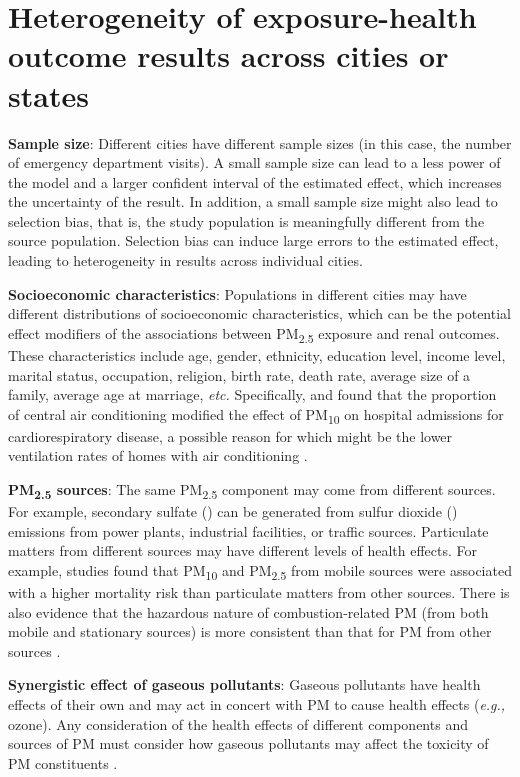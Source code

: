 \documentclass[11pt]{article}
\newcommand{\tsub}{\textsubscript}
\begin{document}
\section{Heterogeneity of exposure-health outcome results across cities or states}
\begin{enumerate*}[{[1)]}]
    \item \textbf{Sample size}: Different cities have different sample sizes (in this case, the number of emergency department visits). A small sample size can lead to a less power of the model and a larger confident interval of the estimated effect, which increases the uncertainty of the result. In addition, a small sample size might also lead to selection bias, that is, the study population is meaningfully different from the source population. Selection bias can induce large errors to the estimated effect, leading to heterogeneity in results across individual cities. 
    \item \textbf{Socioeconomic characteristics}: Populations in different cities may have different distributions of socioeconomic characteristics, which can be the potential effect modifiers of the associations between PM\tsub{2.5} exposure and renal outcomes. These characteristics include age, gender, ethnicity, education level, income level, marital status, occupation, religion, birth rate, death rate, average size of a family, average age at marriage, \textit{etc.} Specifically, \citet{janssen2002air} and \citet{medina2006effect} found that the proportion of central air conditioning modified the effect of PM\tsub{10} on hospital admissions for cardiorespiratory disease, a possible reason for which might be the lower ventilation rates of homes with air conditioning \citep{suh1992personal}. 
    \item \textbf{PM\tsub{2.5} sources}: The same PM\tsub{2.5} component may come from different sources. For example, secondary sulfate () can be generated from sulfur dioxide () emissions from power plants, industrial facilities, or traffic sources. Particulate matters from different sources may have different levels of health effects. For example, studies \citep{laden2000association, zeka2005short} found that PM\tsub{10} and PM\tsub{2.5} from mobile sources were associated with a higher mortality risk than particulate matters from other sources. There is also evidence that the hazardous nature of combustion-related PM (from both mobile and stationary sources) is more consistent than that for PM from other sources \citep{world2007health}.
    \item \textbf{Synergistic effect of gaseous pollutants}: Gaseous pollutants have health effects of their own and may act in concert with PM to cause health effects (\textit{e.g.,} ozone). Any consideration of the health effects of different components and sources of PM must consider how gaseous pollutants may affect the toxicity of PM constituents \citep{adams2015particulate}.

\end{enumerate*}
\end{document}
